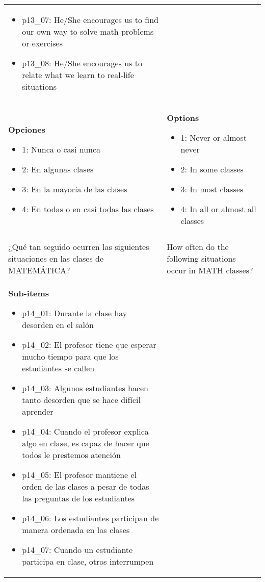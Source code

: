 \documentclass[11pt]{article}
\begin{document}
\begin{longtable}{@{}LL@{}}
\begin{itemize}[leftmargin=*]
\item p13\_07: He/She encourages us to find our own way to solve math problems or exercises
\item p13\_08: He/She encourages us to relate what we learn to real-life situations\end{itemize} \\
\textbf{Opciones}\par\begin{itemize}[leftmargin=*]\item 1: Nunca o casi nunca
\item 2: En algunas clases
\item 3: En la mayoría de las clases
\item 4: En todas o en casi todas las clases\end{itemize} & \textbf{Options}\par\begin{itemize}[leftmargin=*]\item 1: Never or almost never
\item 2: In some classes
\item 3: In most classes
\item 4: In all or almost all classes\end{itemize} \\
\addlinespace[4pt]
 \\ 
¿Qué tan seguido ocurren las siguientes situaciones en las clases de MATEMÁTICA? & How often do the following situations occur in MATH classes? \\
\textbf{Sub-items}\par\begin{itemize}[leftmargin=*]\item p14\_01: Durante la clase hay desorden en el salón
\item p14\_02: El profesor tiene que esperar mucho tiempo para que los estudiantes se callen
\item p14\_03: Algunos estudiantes hacen tanto desorden que se hace difícil aprender
\item p14\_04: Cuando el profesor explica algo en clase, es capaz de hacer que todos le prestemos atención
\item p14\_05: El profesor mantiene el orden de las clases a pesar de todas las preguntas de los estudiantes
\item p14\_06: Los estudiantes participan de manera ordenada en las clases
\item p14\_07: Cuando un estudiante participa en clase, otros interrumpen

\end{itemize}
\end{longtable}
\end{document}
